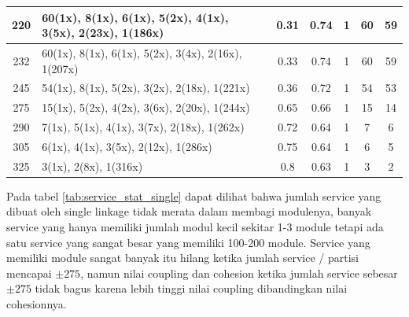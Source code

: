 \begin{small}
\begin{longtable}{|c|p{4cm}|c|c|c|c|c|}
220 & 60(1x), 8(1x), 6(1x), 5(2x), 4(1x), 3(5x), 2(23x), 1(186x) & 0.31 & 0.74 & 1 & 60 & 59 \\   \hline
232 & 60(1x), 8(1x), 6(1x), 5(2x), 3(4x), 2(16x), 1(207x) & 0.33 & 0.74 & 1 & 60 & 59 \\   \hline
245 & 54(1x), 8(1x), 5(2x), 3(2x), 2(18x), 1(221x) & 0.36 & 0.72 & 1 & 54 & 53 \\   \hline
275 & 15(1x), 5(2x), 4(2x), 3(6x), 2(20x), 1(244x) & 0.65 & 0.66 & 1 & 15 & 14 \\   \hline
290 & 7(1x), 5(1x), 4(1x), 3(7x), 2(18x), 1(262x) & 0.72 & 0.64 & 1 & 7 & 6 \\   \hline
305 & 6(1x), 4(1x), 3(5x), 2(12x), 1(286x) & 0.75 & 0.64 & 1 & 6 & 5 \\   \hline
325 & 3(1x), 2(8x), 1(316x) & 0.8 & 0.63 & 1 & 3 & 2 \\   \hline
	
\end{longtable}
\end{small}
\endgroup

Pada tabel \ref{tab:service_stat_single} dapat dilihat bahwa jumlah service yang dibuat oleh single linkage tidak merata dalam membagi modulenya, banyak service yang hanya memiliki jumlah modul kecil sekitar 1-3 module tetapi ada satu service yang sangat besar yang memiliki 100-200 module. Service yang memiliki module sangat banyak itu hilang ketika jumlah service / partisi mencapai $\pm 275$, namun nilai coupling dan cohesion ketika jumlah service sebesar $\pm 275$ tidak bagus karena lebih tinggi nilai coupling dibandingkan nilai cohesionnya.


